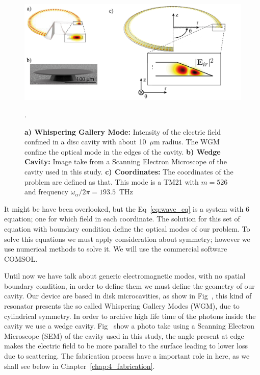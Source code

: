 \begin{figure}[b!]
    \centering
    \includegraphics[width =16cm]{Dissertation_wgm.jpg}
    \caption{\textbf{a) Whispering Gallery Mode:} Intensity of the electric field confined in a disc cavity with about 10~$\mu$m radius. The WGM confine the optical mode in the edges of the cavity. \textbf{b) Wedge Cavity:} Image take from a Scanning Electron Microscope of the cavity used in this study. \textbf{c) Coordinates:} The coordinates of the problem are defined as that. This mode is a TM21 with $m = 526$ and frequency $\omega_\alpha/2\pi = 193.5$~THz}.
    \label{fig:wgm}
\end{figure}
It might be have been overlooked, but the Eq~\ref{eq:wave_eq} is a system with 6 equation; one for which field in each coordinate. The solution for this set of equation with boundary condition define the optical modes of our problem. To solve this equations we must apply consideration about symmetry; however we use numerical methods to solve it. We will use the commercial software COMSOL\regmark.

Until now we have talk about generic electromagnetic modes, with no spatial boundary condition, in order to define them we must define the geometry of our cavity. Our device are based in disk microcavities, as show in Fig~, this kind of resonator presents the so called Whispering Gallery Modes (WGM), due to cylindrical symmetry. In order to archive high life time of the photons inside the cavity we use a wedge cavity. Fig~ show a photo take using a Scanning Electron Microscope (SEM) of the cavity used in this study, the angle present at edge makes the electric field to be more parallel to the surface leading to lower loss due to scattering\cite{Lee2012}. The fabrication process have a important role in here, as we shall see below in Chapter~\ref{chap:4_fabrication}. 

